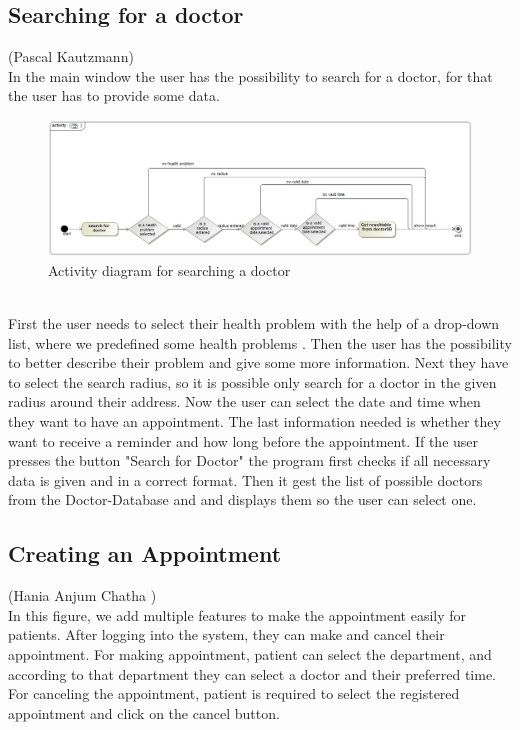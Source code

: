 \documentclass[a4paper, 12pt]{report}
\begin{document}
\subsection{Searching for a doctor}
{\tiny (Pascal Kautzmann)\\}
In the main window the user has the possibility to search for a doctor, for that the user has to provide some data.
\begin{figure}[!h]
\includegraphics[width=\linewidth]{doctorsearch.jpg} 
\caption{Activity diagram for searching a doctor}
\end{figure}
\\First the user needs to select their health problem with the help of a drop-down list, where we predefined some health problems .
Then the user has the possibility to better describe their problem and give some more information.
Next they have to select the search radius, so it is possible only search for a doctor in the given radius around their address.
Now the user can select the date and time when they want to have an appointment.
The last information needed is whether they want to receive a reminder and how long before the appointment.
If the user presses the button "Search for Doctor" the program first checks if all necessary data is given and in a correct format. Then it gest the list of possible doctors from the Doctor-Database and and displays them so the user can select one.

\subsection{Creating an Appointment}
{\tiny (Hania Anjum Chatha )\\}
In this figure, we add multiple features to make the appointment easily for patients. After logging into the system, they can make and cancel their appointment. For making appointment, patient can select the department, and according to that department they can select a doctor and their preferred time. For canceling the appointment, patient is required to select the registered appointment and click on the cancel button.
\end{document}
